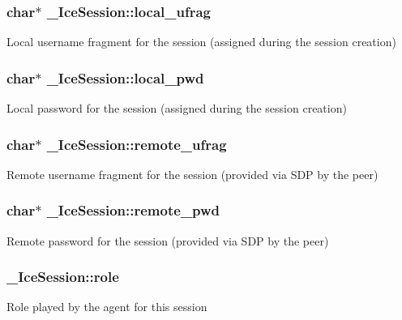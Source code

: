 \subsubsection[{local\_\-ufrag}]{\setlength{\rightskip}{0pt plus 5cm}char$\ast$ {\bf \_\-IceSession::local\_\-ufrag}}\label{struct__IceSession_a25a86fb6bbe126c11e8f3081b6ffb3ad}
Local username fragment for the session (assigned during the session creation) 
\subsubsection[{local\_\-pwd}]{\setlength{\rightskip}{0pt plus 5cm}char$\ast$ {\bf \_\-IceSession::local\_\-pwd}}\label{struct__IceSession_aae2c15f2276b71df770d6f28e368a5be}
Local password for the session (assigned during the session creation) 
\subsubsection[{remote\_\-ufrag}]{\setlength{\rightskip}{0pt plus 5cm}char$\ast$ {\bf \_\-IceSession::remote\_\-ufrag}}\label{struct__IceSession_a1c31f66a6a483f6bef1fd41cba354755}
Remote username fragment for the session (provided via SDP by the peer) 
\subsubsection[{remote\_\-pwd}]{\setlength{\rightskip}{0pt plus 5cm}char$\ast$ {\bf \_\-IceSession::remote\_\-pwd}}\label{struct__IceSession_a02b6c6bf7d1aeca916226f37ac074645}
Remote password for the session (provided via SDP by the peer) 
\subsubsection[{role}]{ {\bf \_\-IceSession::role}}\label{struct__IceSession_ae05f81c7775a437b327aa8b0e6c701bf}
Role played by the agent for this session 
